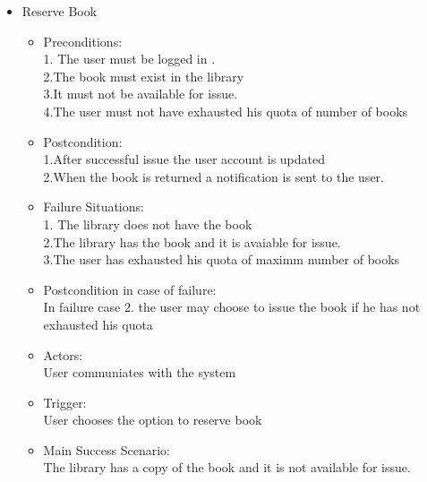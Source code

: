 \documentclass{article}
\begin{document}
\begin{enumerate}
\begin{itemize}
 \item Reserve Book\\
	\begin{itemize}
	\item  Preconditions:\\
	1. The user must be logged in .\\
	2.The book must exist in the library\\ 
	3.It must not  be available for issue.\\
	4.The user must not have exhausted his quota of number of books\\
 \item Postcondition:\\
 1.After successful issue the user account is updated \\
 2.When the book is returned a notification is sent to the user.\\
 \item Failure Situations:\\
 1. The library does not have  the book \\
 2.The library has the book and it is  avaiable for issue.\\
 3.The user has exhausted his quota of maximm number of books\\
 \item Postcondition in case of failure:\\In failure case 2. the user may choose to issue the book if he has not exhausted his quota\\
 \item Actors:\\ User communiates with the system\\
 \item Trigger:\\ User chooses the option to reserve book\\
 \item Main Success Scenario:\\ The library has a copy of the book and it is not available for issue.\\
 
	\end{itemize}
 

\end{itemize}
\end{enumerate}
\end{document}
